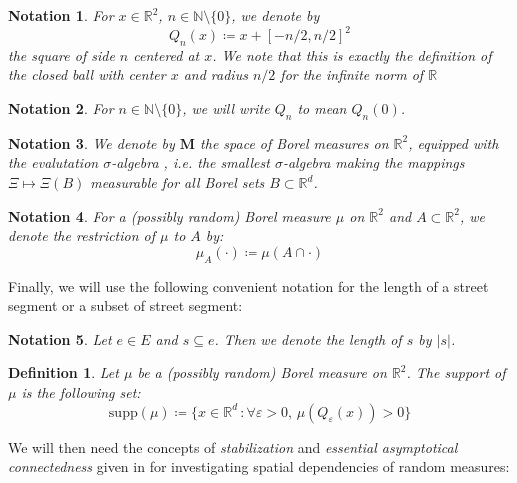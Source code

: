 \documentclass[10pt,a4paper]{amsart}
\theoremstyle{exampstyle}
\newtheorem{Definition}{Definition}
\theoremstyle{exampnotations}
\newtheorem{Notation}{Notation}
\begin{document}
\begin{Notation}
For $x \in \mathbb{R}^{2}$, $n \in \mathbb{N} \setminus \lbrace 0 \rbrace$, we denote by $$Q_n(x) \coloneqq x + \left[-n/2,n/2\right]^{2}$$ the square of side $n$ centered at $x$. We note that this is exactly the definition of the closed ball with center $x$ and radius $n/2$ for the infinite norm of $\mathbb{R}$
\end{Notation}

\begin{Notation}
For $n \in \mathbb{N} \setminus \lbrace 0 \rbrace$, we will write 
$Q_n$ to mean $Q_n(0)$.
\end{Notation}

\begin{Notation}
We denote by $\mathbf{M}$ the space of Borel measures on $\mathbb{R}^{2}$, equipped with the evalutation $\sigma$-algebra \cite[Section 13.1]{last2017lectures}, i.e. the smallest $\sigma$-algebra making the mappings $\Xi \mapsto \Xi(B)$ measurable for all Borel sets $B \subset \mathbb{R}^{d}$.
\end{Notation}

\begin{Notation}
For a (possibly random) Borel measure $\mu$ on $\mathbb{R}^{2}$ and $A \subset \mathbb{R}^{2}$, we denote the restriction of $\mu$ to $A$ by: $$\mu_A(\cdot) \coloneqq \mu(A \cap \cdot)$$
\end{Notation}

Finally, we will use the following convenient notation for the length of a street segment or a subset of street segment:
\begin{Notation}
Let $e \in E$ and $s \subseteq e$. Then we denote the length of $s$ by $\vert s \vert$.
\end{Notation}

\begin{Definition}
Let $\mu$ be a (possibly random) Borel measure on $\mathbb{R}^{2}$. The \emph{support} of $\mu$ is the following set:
$$\text{supp}(\mu) \coloneqq \lbrace x \in \mathbb{R}^{d} \, : \forall \varepsilon > 0, \,  \mu(Q_{\varepsilon}(x)) > 0 \rbrace$$
\end{Definition}
We will then need the concepts of \emph{stabilization} and \emph{essential asymptotical connectedness} given in \cite{hirsch_continuum_2017} for investigating spatial dependencies of random measures:
\end{document}
